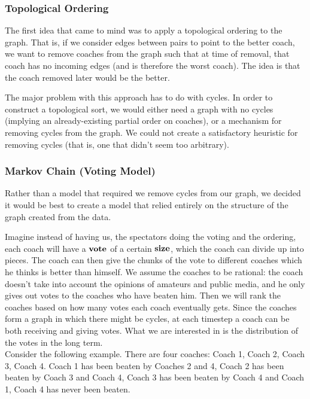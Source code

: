 \documentclass[titlepage,12pt]{article}
\begin{document}
\subsubsection{Topological Ordering}
The first idea that came to mind was to apply a topological ordering to the graph. That is, if we consider edges between pairs to point to the better coach, we want to remove coaches from the graph such that at time of removal, that coach has no incoming edges (and is therefore the worst coach). The idea is that the coach removed later would be the better.

The major problem with this approach has to do with cycles. In order to construct a topological sort, we would either need a graph with no cycles (implying an already-existing partial order on coaches), or a mechanism for removing cycles from the graph. We could not create a satisfactory heuristic for removing cycles (that is, one that didn't seem too arbitrary).

\subsubsection{Markov Chain (Voting Model)}
Rather than a model that required we remove cycles from our graph, we decided it would be best to create a model that relied entirely on the structure of the graph created from the data.


\noindent Imagine instead of having us, the spectators doing the voting and the ordering, each coach will have a $\bf{vote}$ of a certain $\bf{size}$, which the coach can divide up into pieces. The coach can then give the chunks of the vote to different coaches which he thinks is better than himself. We assume the coaches to be rational: the coach doesn't take into account the opinions of amateurs and public media, and he only gives out votes to the coaches who have beaten him. Then we will rank the coaches based on how many votes each coach eventually gets. Since the coaches form a graph in which there might be cycles, at each timestep a coach can be both receiving and giving votes. What we are interested in is the distribution of the votes in the long term.
\\

\noindent Consider the following example. There are four coaches: Coach 1, Coach 2, Coach 3, Coach 4. Coach 1 has been beaten by Coaches 2 and 4, Coach 2 has been beaten by Coach 3 and Coach 4, Coach 3 has been beaten by Coach 4 and Coach 1, Coach 4 has never been beaten.
\end{document}
